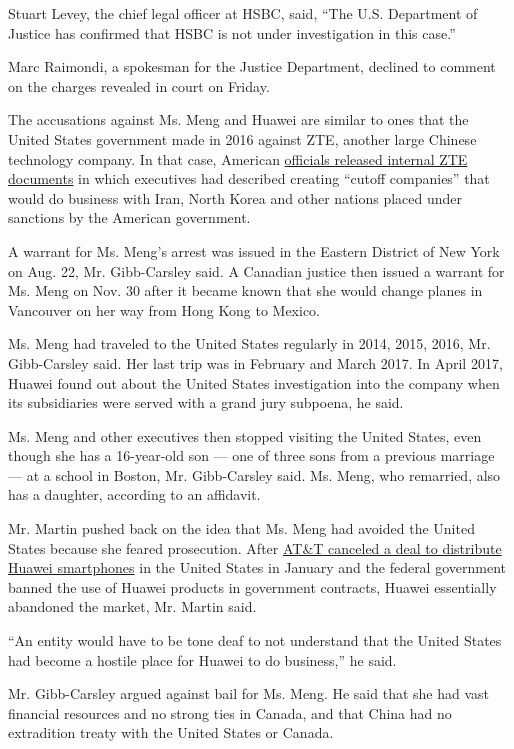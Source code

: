 Stuart Levey, the chief legal officer at HSBC, said, ``The U.S.
Department of Justice has confirmed that HSBC is not under investigation
in this case.''

Marc Raimondi, a spokesman for the Justice Department, declined to
comment on the charges revealed in court on Friday.

The accusations against Ms. Meng and Huawei are similar to ones that the
United States government made in 2016 against ZTE, another large Chinese
technology company. In that case, American
\href{https://www.nytimes.com/2016/03/19/technology/zte-document-raises-questions-about-huawei-and-sanctions.html?module=inline}{officials
released internal ZTE documents} in which executives had described
creating ``cutoff companies'' that would do business with Iran, North
Korea and other nations placed under sanctions by the American
government.

A warrant for Ms. Meng's arrest was issued in the Eastern District of
New York on Aug. 22, Mr. Gibb-Carsley said. A Canadian justice then
issued a warrant for Ms. Meng on Nov. 30 after it became known that she
would change planes in Vancouver on her way from Hong Kong to Mexico.

Ms. Meng had traveled to the United States regularly in 2014, 2015,
2016, Mr. Gibb-Carsley said. Her last trip was in February and March
2017. In April 2017, Huawei found out about the United States
investigation into the company when its subsidiaries were served with a
grand jury subpoena, he said.

Ms. Meng and other executives then stopped visiting the United States,
even though she has a 16-year-old son --- one of three sons from a
previous marriage --- at a school in Boston, Mr. Gibb-Carsley said. Ms.
Meng, who remarried, also has a daughter, according to an affidavit.

Mr. Martin pushed back on the idea that Ms. Meng had avoided the United
States because she feared prosecution. After
\href{https://www.nytimes.com/2018/01/09/business/att-huawei-mate-smartphone.html}{AT\&T
canceled a deal to distribute Huawei smartphones} in the United States
in January and the federal government banned the use of Huawei products
in government contracts, Huawei essentially abandoned the market, Mr.
Martin said.

``An entity would have to be tone deaf to not understand that the United
States had become a hostile place for Huawei to do business,'' he said.

Mr. Gibb-Carsley argued against bail for Ms. Meng. He said that she had
vast financial resources and no strong ties in Canada, and that China
had no extradition treaty with the United States or Canada.

